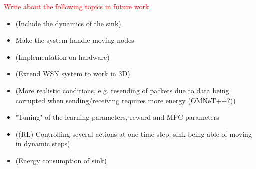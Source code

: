\textcolor{red}{Write about the following topics in future work}
\begin{itemize}
\color{red}
    \item (Include the dynamics of the sink)
    \item Make the system handle moving nodes
    \item (Implementation on hardware)
    \item (Extend WSN system to work in 3D)
    \item (More realistic conditions, e.g. resending of packets due to data being corrupted when sending/receiving requires more energy (OMNeT++?))
    \item "Tuning" of the learning parameters, reward and MPC parameters 
    \item ((RL) Controlling several actions at one time step, sink being able of moving in dynamic steps) 
    \item (Energy consumption of sink)
\end{itemize}

